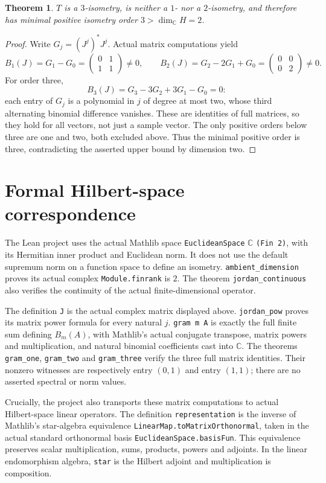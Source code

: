 \documentclass[10pt]{article}
\newtheorem{theorem}{Theorem}
\begin{document}
\begin{theorem}
$T$ is a $3$-isometry, is neither a $1$- nor a $2$-isometry, and therefore
has minimal positive isometry order $3>\dim_{\mathbb C}H=2$.
\end{theorem}
\begin{proof}
Write $G_j=(J^j)^*J^j$. Actual matrix computations yield
\[
 B_1(J)=G_1-G_0=\begin{pmatrix}0&1\\1&1\end{pmatrix}\ne0,
 \qquad
 B_2(J)=G_2-2G_1+G_0=\begin{pmatrix}0&0\\0&2\end{pmatrix}\ne0.
\]
For order three,
\[
 B_3(J)=G_3-3G_2+3G_1-G_0=0:
\]
each entry of $G_j$ is a polynomial in $j$ of degree at most two, whose
third alternating binomial difference vanishes. These are identities of
full matrices, so they hold for all vectors, not just a sample vector.
The only positive orders below three are one and two, both excluded above.
Thus the minimal positive order is three, contradicting the asserted
upper bound by dimension two.
\end{proof}

\newpage
\section*{Formal Hilbert-space correspondence}
The Lean project uses the actual Mathlib space
\texttt{EuclideanSpace} $\mathbb C$ \texttt{(Fin 2)}, with its Hermitian inner
product and Euclidean norm. It does not use the default supremum norm on a
function space to define an isometry.
\texttt{ambient\_dimension} proves its actual complex \texttt{Module.finrank}
is $2$. The theorem \texttt{jordan\_continuous} also verifies the
continuity of the actual finite-dimensional operator.

The definition \texttt{J} is the actual complex matrix displayed above.
\texttt{jordan\_pow} proves its matrix power formula for every natural $j$.
\texttt{gram m A} is exactly the full finite sum defining $B_m(A)$,
with Mathlib's actual conjugate transpose, matrix powers and multiplication,
and natural binomial coefficients cast into $\mathbb C$.
The theorems \texttt{gram\_one}, \texttt{gram\_two} and
\texttt{gram\_three} verify the three full matrix identities.
Their nonzero witnesses are respectively entry $(0,1)$ and entry $(1,1)$;
there are no asserted spectral or norm values.

Crucially, the project also transports these matrix computations to
actual Hilbert-space linear operators. The definition
\texttt{representation} is the inverse of Mathlib's star-algebra equivalence
\texttt{LinearMap.toMatrixOrthonormal}, taken in the actual standard
orthonormal basis \texttt{EuclideanSpace.basisFun}. This equivalence
preserves scalar multiplication, sums, products, powers and adjoints.
In the linear endomorphism algebra, \texttt{star} is the Hilbert adjoint
and multiplication is composition.
\end{document}
